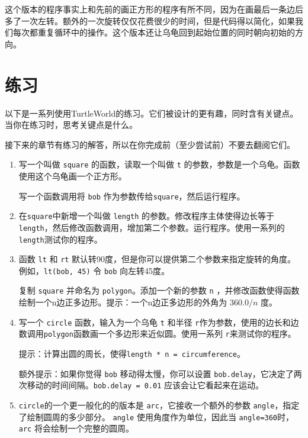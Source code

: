 这个版本的程序事实上和先前的画正方形的程序有所不同，因为在画最后一条边后多了一次左转。额外的一次旋转仅仅花费很少的时间，但是代码得以简化，如果我们每次都重复循环中的操作。这个版本还让乌龟回到起始位置的同时朝向初始的方向。

\section{练习}
以下是一系列使用TurtleWorld的练习。它们被设计的更有趣，同时含有关键点。当你在练习时，思考关键点是什么。

接下来的章节有练习的解答，所以在你完成前（至少尝试前）不要去翻阅它们。

\begin{enumerate}

\item 写一个叫做 {\tt square} 的函数，读取一个叫做 {\tt t} 的参数，参数是一个乌龟。函数使用这个乌龟画一个正方形。

写一个函数调用将 {\tt bob} 作为参数传给{\tt square}，然后运行程序。

\item 在{\tt square}中新增一个叫做 {\tt length} 的参数。修改程序主体使得边长等于 {\tt length}，然后修改函数调用，增加第二个参数。运行程序。使用一系列的 {\tt length}测试你的程序。

\item 函数 {\tt lt} 和 {\tt rt} 默认转90度，但是你可以提供第二个参数来指定旋转的角度。例如，{\tt lt(bob, 45)} 令 {\tt bob} 向左转45度。

复制 {\tt square} 并命名为 {\tt polygon}。添加一个新的参数 {\tt n} ，并修改函数使得函数绘制一个n边正多边形。提示：一个n边正多边形的外角为 $360.0 / n$ 度。


\item 写一个 {\tt circle} 函数，输入为一个乌龟 {\tt t} 和半径 {\tt r}作为参数，使用的边长和边数调用{\tt polygon}函数画一个多边形来近似圆。使用一系列 {\tt r}来测试你的程序。


提示：计算出圆的周长，使得{\tt length * n = circumference}。

额外提示：如果你觉得 {\tt bob} 移动得太慢，你可以设置 {\tt bob.delay}，它决定了两次移动的时间间隔。{\tt bob.delay = 0.01} 应该会让它看起来在运动。

\item {\tt circle}的一个更一般化的的版本是 {\tt arc}，它接收一个额外的参数 {\tt angle}，指定了绘制圆周的多少部分。 {\tt angle} 使用角度作为单位，因此当 {\tt angle=360}时， {\tt arc} 将会绘制一个完整的圆周。


\end{enumerate}

